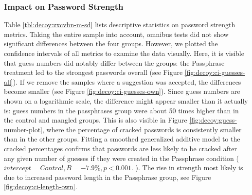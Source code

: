 \subsubsection{Impact on Password Strength}
Table \ref{tbl:decoy:zxcvbn-m-sd} lists descriptive statistics on password strength metrics. Taking the entire sample into account, omnibus tests did not show significant differences between the four groups. However, we plotted the confidence intervals of all metrics to examine the data visually. Here, it is visible that guess numbers did notably differ between the groups: the Passphrase treatment led to the strongest passwords overall (see Figure \ref{fig:decoy:ci-guesses-all}). If we remove the samples where a suggestion was accepted, the differences become smaller (see Figure \ref{fig:decoy:ci-guesses-own}). Since guess numbers are shown on a logarithmic scale, the difference might appear smaller than it actually is: guess numbers in the passphrases group were about 50 times higher than in the control and mangled groups. This is also visible in Figure \ref{fig:decoy:guess-number-plot}, where the percentage of cracked passwords is consistently smaller than in the other groups. Fitting a smoothed generalized additive model to the cracked percentages confirms that passwords are less likely to be cracked after any given number of guesses if they were created in the Passphrase condition ($intercept=Control,B=-7.9\%, p<0.001$. ). The rise in strength most likely is due to increased password length in the Passphrase group, see Figure \ref{fig:decoy:ci-length-own}.




